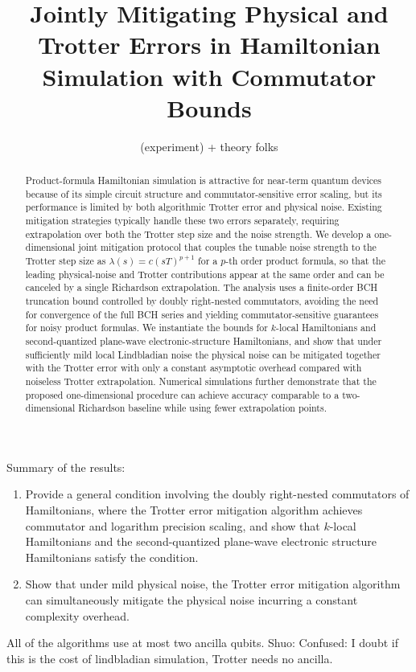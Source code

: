 \documentclass[11pt]{article}
\title{Jointly Mitigating Physical and Trotter Errors in Hamiltonian Simulation with Commutator Bounds
}
\author{(experiment) + theory folks}
\date{}
\newcommand{\mc}{\mathcal}
\newcommand{\sz}[1]{{\color{blue} Shuo: #1}}
\begin{document}
\maketitle

\begin{abstract}
Product-formula Hamiltonian simulation is attractive for near-term quantum devices because of its simple circuit structure and commutator-sensitive error scaling, but its performance is limited by both algorithmic Trotter error and physical noise. Existing mitigation strategies typically handle these two errors separately, requiring extrapolation over both the Trotter step size and the noise strength. We develop a one-dimensional joint mitigation protocol that couples the tunable noise strength to the Trotter step size as $\lambda(s)=c(sT)^{p+1}$ for a $p$-th order product formula, so that the leading physical-noise and Trotter contributions appear at the same order and can be canceled by a single Richardson extrapolation. The analysis uses a finite-order BCH truncation bound controlled by doubly right-nested commutators, avoiding the need for convergence of the full BCH series and yielding commutator-sensitive guarantees for noisy product formulas. We instantiate the bounds for $k$-local Hamiltonians and second-quantized plane-wave electronic-structure Hamiltonians, and show that under sufficiently mild local Lindbladian noise the physical noise can be mitigated together with the Trotter error with only a constant asymptotic overhead compared with noiseless Trotter extrapolation. Numerical simulations further demonstrate that the proposed one-dimensional procedure can achieve accuracy comparable to a two-dimensional Richardson baseline while using fewer extrapolation points.
\end{abstract}

Summary of the results: 
\begin{enumerate}
    \item Provide a general condition involving the doubly right-nested commutators of Hamiltonians, where the Trotter error mitigation algorithm \cite{watson2025exponentially} achieves commutator and logarithm precision scaling, and show that $k$-local Hamiltonians and the second-quantized plane-wave electronic structure Hamiltonians satisfy the condition.
    \item Show that under mild physical noise, the Trotter error mitigation algorithm can simultaneously mitigate the physical noise incurring a constant complexity overhead. 
\end{enumerate}
All of the algorithms use at most two ancilla qubits. \sz{Confused: I doubt if this is the cost of lindbladian simulation, Trotter needs no ancilla.} 
\end{document}
